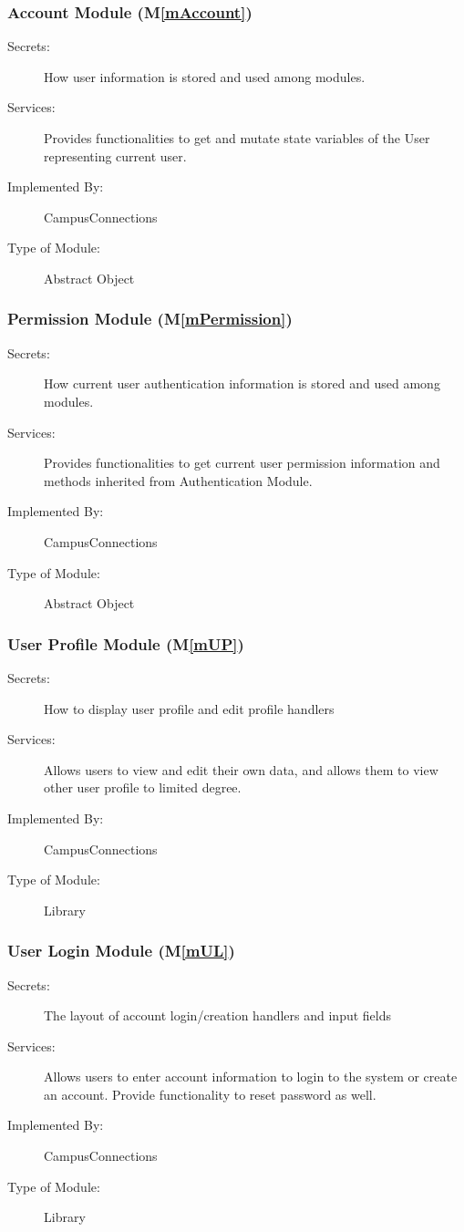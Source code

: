 \documentclass[12pt, titlepage]{article}
\newcommand{\mref}[1]{M\ref{#1}}
\begin{document}
\subsubsection{Account Module (\mref{mAccount})}
\begin{description}
  \item[Secrets:]How user information is stored and used among modules.
  \item[Services:]Provides functionalities to get and mutate state variables of the User representing current user.
  \item[Implemented By:] CampusConnections
  \item[Type of Module:] Abstract Object
\end{description}

\subsubsection{Permission Module (\mref{mPermission})}
\begin{description}
  \item[Secrets:]How current user authentication information is stored and used among modules.
  \item[Services:]Provides functionalities to get current user permission information and methods inherited from Authentication Module.
  \item[Implemented By:] CampusConnections
  \item[Type of Module:] Abstract Object
\end{description}

\subsubsection{User Profile Module (\mref{mUP})}
\begin{description}
  \item[Secrets:]How to display user profile and edit profile handlers
  \item[Services:]Allows users to view and edit their own data, and allows them to view other user profile to limited degree.
  \item[Implemented By:] CampusConnections
  \item[Type of Module:] Library
\end{description}

\subsubsection{User Login Module (\mref{mUL})}
\begin{description}
  \item[Secrets:]The layout of account login/creation handlers and input fields
  \item[Services:]Allows users to enter account information to login to the system or create an account. Provide functionality to reset password as well.
  \item[Implemented By:] CampusConnections
  \item[Type of Module:] Library
\end{description}
\end{document}
